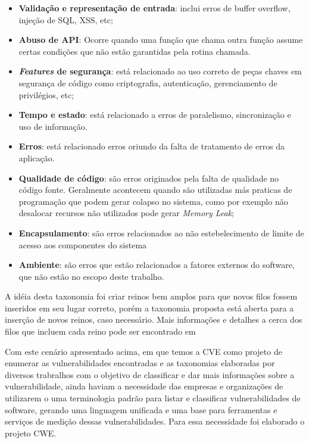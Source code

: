 \begin{itemize}
\item \textbf{Validação e representação de entrada}: inclui erros de buffer overflow, injeção de SQL, XSS, etc;
\item \textbf{Abuso de API}: Ocorre quando uma função que chama outra função assume certas condições que não estão garantidas pela rotina chamada.
\item \textbf{\emph{Features} de segurança}: está relacionado ao uso correto de peças chaves em segurança de código como criptografia, autenticação, gerenciamento de privilégios, etc;
\item \textbf{Tempo e estado}: está relacionado a erros de paralelismo, sincronização e uso de informação.
\item \textbf{Erros}: está relacionado erros oriundo da falta de tratamento de erros da aplicação.
\item \textbf{Qualidade de código}: são erros originados pela falta de qualidade no código fonte. Geralmente acontecem quando são utilizadas más praticas de programação que podem gerar colapso no sistema, como por exemplo não desalocar recursos não utilizados pode gerar \emph{Memory Leak};
\item \textbf{Encapsulamento}: são erros relacionados ao não estebelecimento de limite de acesso aos componentes do sistema
\item \textbf{Ambiente}: são erros que estão relacionados a fatores externos do software, que não estão no escopo deste trabalho.

\end{itemize}

A idéia desta taxonomia foi criar reinos bem amplos para que novos filos fossem inseridos em seu lugar correto, porém a taxonomia proposta está aberta para a inserção de novos reinos, caso necessário. Mais informações e detalhes a cerca dos filos que incluem cada reino pode ser encontrado em \cite{tsipenyuk2005}

%
Com este cenário apresentado acima, em que temos a CVE como projeto de enumerar as vulnerabilidades encontradas e as taxonomias elaboradas por diversos trabralhos com o objetivo de classificar e dar mais informações sobre a vulnerabilidade, ainda haviam a necessidade das empresas e organizações de utilizarem o uma terminologia padrão para listar e classificar vulnerabilidades de software, gerando uma linguagem unificada e uma base para ferramentas e serviços de medição dessas vulnerabilidades. Para essa necessidade foi elaborado o projeto CWE.

